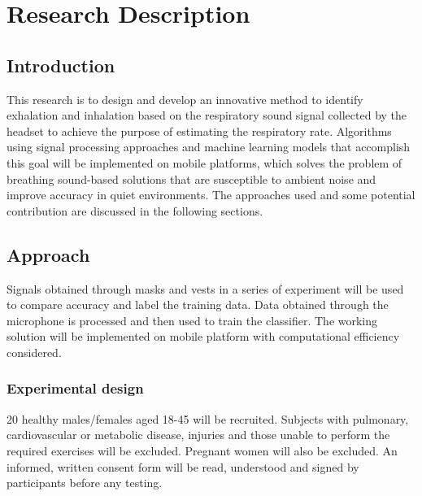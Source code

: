 \chapter{Research Description}
\section{Introduction}
This research is to design and develop an innovative method to identify exhalation and inhalation based on the respiratory sound signal collected by the headset to achieve the purpose of estimating the respiratory rate. Algorithms using signal processing approaches and machine learning models that accomplish this goal will be implemented on mobile platforms, which solves the problem of breathing sound-based solutions that are susceptible to ambient noise and improve accuracy in quiet environments. The approaches used and some potential contribution are discussed in the following sections.

\section{Approach}
Signals obtained through masks and vests in a series of experiment will be used to compare accuracy and label the training data. Data obtained through the microphone is processed and then used to train the classifier. The working solution will be implemented on mobile platform with computational efficiency considered.

\subsection{Experimental design}
20 healthy males/females aged 18-45 will be recruited. Subjects with pulmonary, cardiovascular or metabolic disease, injuries and those unable to perform the required exercises will be excluded. Pregnant women will also be excluded. An informed, written consent form will be read, understood and signed by participants before any testing. 


